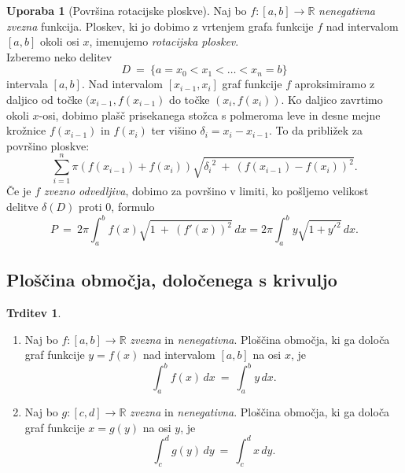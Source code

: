 \documentclass[11pt]{article}
\newcommand{\R}{\mathbb{R}}
\theoremstyle{definition}
\theoremstyle{definition}
\newtheorem{trditev}{Trditev}[section]
\theoremstyle{definition}
\theoremstyle{theorem}
\newtheorem{uporaba}{Uporaba}[section]
\begin{document}
\begin{uporaba}[Površina rotacijske ploskve]

Naj bo $f:[a, b] \rightarrow \mathbb{R}$ \textit{nenegativna zvezna} funkcija. Ploskev, ki jo dobimo z vrtenjem grafa funkcije $f$ nad intervalom $[a, b]$ okoli osi $x$, imenujemo \textit{rotacijska ploskev}. \\

Izberemo neko delitev
$$D ~=~ \{a = x_0 < x_1 < \ldots < x_n = b\}$$
intervala $[a, b]$. Nad intervalom $[x_{i-1}, x_i]$ graf funkcije $f$ aproksimiramo z daljico od točke $(x_{i-1}, f(x_{i-1})$ do točke $(x_i, f(x_i))$. Ko daljico zavrtimo okoli $x$-osi, dobimo plašč prisekanega stožca s polmeroma leve in desne mejne krožnice $f(x_{i-1})$ in $f(x_i)$ ter višino $\delta_i = x_i - x_{i-1}$. To da približek za površino ploskve:
$$\sum_{i=1}^{n} \pi (f(x_{i-1}) + f(x_i)) \sqrt{{\delta_i}^2 ~+~ (f(x_{i-1}) - f(x_i))^2}.$$
Če je $f$ \textit{zvezno odvedljiva}, dobimo za površino v limiti, ko pošljemo velikost delitve $\delta(D)$ proti $0$, formulo
$$P ~=~ 2 \pi \int_{a}^{b} f(x) \sqrt{1 ~+~ (f'(x))^2}\,dx = 2 \pi \int_{a}^{b} y \sqrt{1 + {y'}^2}\,dx.$$

\end{uporaba}
\vspace{0.5cm}


\subsection{Ploščina območja, določenega s krivuljo}
\vspace{0.5cm}

\begin{trditev}
~
\begin{enumerate}
	\item Naj bo $f: [a, b] \rightarrow \R$ \textit{zvezna} in \textit{nenegativna}. Ploščina območja, ki ga določa graf funkcije $y = f(x)$ nad intervalom $[a, b]$ na osi $x$, je
	$$\int_a^b f(x)\,dx ~=~ \int_a^b y\,dx.$$
	
	\item Naj bo $g: [c, d] \rightarrow \R$ \textit{zvezna} in \textit{nenegativna}. Ploščina območja, ki ga določa graf funkcije $x = g(y)$ na osi $y$, je
	$$\int_c^d g(y)\,dy ~=~ \int_c^d x\,dy.$$
\end{enumerate}
\end{trditev}
\vspace{0.5cm}
\end{document}
